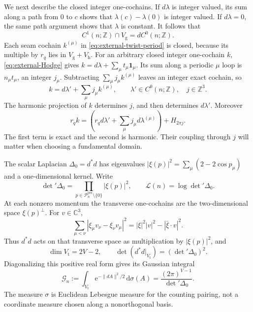 \documentclass[11pt,letterpaper,reqno]{amsart}
\newcommand{\C}{\mathbb C}
\newcommand{\Z}{\mathbb Z}
\newcommand{\dd}{\mathrm d}
\begin{document}
We next describe the closed integer one-cochains. If $d\lambda$
is integer valued, its sum along a path from $0$ to $c$ shows
that $\lambda(c)-\lambda(0)$ is integer valued. If $d\lambda=0$,
the same path argument shows that $\lambda$ is constant.
It follows that
\[
 C^1(n;\Z)\cap V_{\mathrm g}=dC^0(n;\Z).
\]
Each seam cochain $k^{(\mu)}$ in
\eqref{eq:external-twist-period} is closed, because its
multiple by $r_q$ lies in $V_{\mathrm g}+V_{\mathrm h}$.
For an arbitrary closed integer one-cochain $k$,
\eqref{eq:external-Hodge} gives
$k=d\lambda+\sum_\mu t_\mu\mathbf1_\mu$.
Its sum along a periodic $\mu$ loop is $n_\mu t_\mu$,
an integer $j_\mu$. Subtracting
$\sum_\mu j_\mu k^{(\mu)}$ leaves an integer exact cochain,
so
\begin{equation}\label{eq:external-closed-integer-one}
 k=d\lambda'+\sum_\mu j_\mu k^{(\mu)},\qquad
 \lambda'\in C^0(n;\Z),\quad j\in\Z^3.
\end{equation}
The harmonic projection of $k$ determines $j$, and then
determines $d\lambda'$. Moreover
\begin{equation}\label{eq:external-integer-Hodge}
 r_qk=
   \left(r_qd\lambda'+\sum_\mu j_\mu d\lambda^{(\mu)}\right)
                         +H_{2\pi j}.
\end{equation}
The first term is exact and the second is harmonic. Their
coupling through $j$ will matter when choosing a fundamental
domain.

The scalar Laplacian $\Delta_0=d^*d$ has eigenvalues
$|\xi(p)|^2=\sum_\mu(2-2\cos p_\mu)$ and a one-dimensional
kernel. Write
\begin{equation}\label{eq:external-scalar-determinant}
 \det{}'\Delta_0=\prod_{p\in\mathcal P_n^{\mathrm{per}}\setminus\{0\}}
                       |\xi(p)|^2,\qquad
 \mathcal L(n)=\log\det{}'\Delta_0.
\end{equation}
At each nonzero momentum the transverse one-cochains
are the two-dimensional space $\xi(p)^\perp$.
For $v\in\C^3$,
\[
 \sum_{\mu<\nu}|\xi_\mu v_\nu-\xi_\nu v_\mu|^2
           =|\xi|^2|v|^2-|\bar\xi\cdot v|^2.
\]
Thus $d^*d$ acts on that transverse space as multiplication
by $|\xi(p)|^2$, and
\begin{equation}\label{eq:external-transverse-determinant}
 \dim V_{\mathrm t}=2V-2,\qquad
 \det(d^*d|_{V_{\mathrm t}})=(\det{}'\Delta_0)^2.
\end{equation}
Diagonalizing this positive real form gives its Gaussian integral
\begin{equation}\label{eq:external-transverse-Gaussian}
 \mathcal G_n:=\int_{V_{\mathrm t}}\mathrm e^{-\|dA\|^2/2}\,\dd\sigma(A)
                    =\frac{(2\pi)^{V-1}}{\det{}'\Delta_0}.
\end{equation}
The measure $\sigma$ is Euclidean Lebesgue measure for the
counting pairing, not a coordinate measure chosen along a
nonorthogonal basis.
\end{document}
